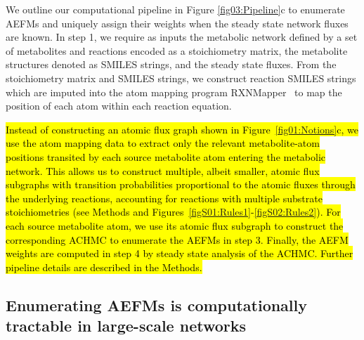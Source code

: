 \documentclass[12pt]{article}
\begin{document}
We outline our computational pipeline in Figure \ref{fig03:Pipeline}c to
enumerate AEFMs and uniquely assign their weights when the steady state
network fluxes are known. In step 1, we require as inputs the metabolic
network defined by a set of metabolites and reactions encoded as
a stoichiometry matrix, the metabolite structures denoted as SMILES
strings, and the steady state fluxes. From the stoichiometry matrix and
SMILES strings, we construct reaction SMILES strings which are imputed
into the atom mapping program RXNMapper~\citep{Schwaller2021extraction} to
map the position of each atom within each reaction equation.

\hl{
Instead of constructing an atomic flux graph shown in
Figure~{\ref{fig01:Notions}}c, we use the atom mapping data to extract only
the relevant metabolite-atom positions transited by each source metabolite
atom entering the metabolic network. This allows us to construct multiple,
albeit smaller, atomic flux subgraphs with transition probabilities
proportional to the atomic fluxes through the underlying reactions,
accounting for reactions with multiple substrate stoichiometries (see
Methods and Figures~{\ref{figS01:Rules1}}-{\ref{figS02:Rules2}}).
For each source metabolite atom, we use its atomic flux subgraph to
construct the corresponding ACHMC to enumerate the AEFMs in step 3.
Finally, the AEFM weights are computed in step 4 by steady state analysis
of the ACHMC. Further pipeline details are described in the Methods.
}

\subsection*{Enumerating AEFMs is computationally tractable in large-scale networks}
\end{document}
